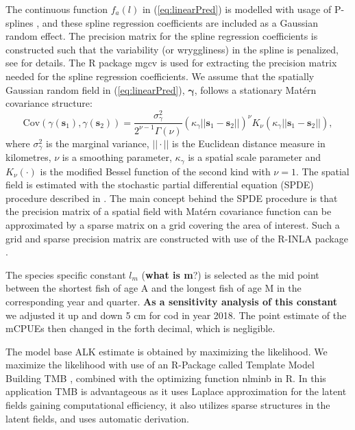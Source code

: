 \documentclass[a4paper 12pt]{article}
\numberwithin{equation}{section}
\begin{document}
The continuous function $f_a(l)$ in (\ref{eq:linearPred}) is modelled with usage of P-splines \citep{wood2017generalized}, and these spline regression coefficients are included as a Gaussian random effect. The precision matrix for the spline regression coefficients is constructed such that the variability (or wryggliness) in the spline is penalized, see \citet[page 239]{wood2017generalized} for details. The R package mgcv \citep{wood2015package} is used for extracting the precision matrix needed for the spline regression coefficients. We assume that the spatially Gaussian random field in (\ref{eq:linearPred}), $\pmb{\gamma}$, follows a stationary Mat\'{e}rn covariance structure:
\begin{equation}\label{eq:matern}
 \text{Cov}(\gamma(\mathbf{s}_1),\gamma(\mathbf{s}_2)) = \frac{\sigma^2_{\gamma}}{2^{\nu-1}\Gamma(\nu)}(\kappa_{\gamma}||\mathbf{s}_1 -\mathbf{s}_2||)^{\nu}K_{\nu}(\kappa_{\gamma}||\mathbf{s}_1-\mathbf{s}_2||),
\end{equation}
where $\sigma^2_{\gamma}$ is the marginal variance, $||\cdot||$ is the Euclidean distance measure in kilometres, $\nu$ is a smoothing parameter, $\kappa_{\gamma}$ is a spatial scale parameter and $K_{\nu}(\cdot)$ is the modified Bessel function of the second kind with $\nu = 1$. The spatial field is estimated with the stochastic partial differential equation (SPDE) procedure described in \citet{lindgren2011explicit}. The main concept behind the SPDE procedure is that the precision matrix of a spatial field with Mat\'{e}rn  covariance function can be approximated by a sparse matrix on a grid covering the area of interest. Such a grid and sparse precision matrix are constructed with use of the R-INLA package \citep{rue2009approximate}.

The species specific constant $l_m$ ({\bf what is m}?) is selected as the mid point between the shortest fish of age A and the longest fish of age M in the corresponding year and quarter. {\bf As a sensitivity analysis of this constant} we adjusted it up and down 5 cm for cod in year 2018. The point estimate of the mCPUEs then changed in the forth decimal, which is negligible.

The model base ALK estimate is obtained by maximizing the likelihood. We maximize the likelihood with use of an R-Package called Template Model Building {\sffamily TMB} \citep{kristensen2015tmb}, combined with the optimizing function {\sffamily nlminb} in R. In this application {\sffamily TMB} is advantageous as it uses Laplace approximation for the latent fields gaining computational efficiency, it also utilizes sparse structures in the latent fields, and uses automatic derivation. 
\end{document}
